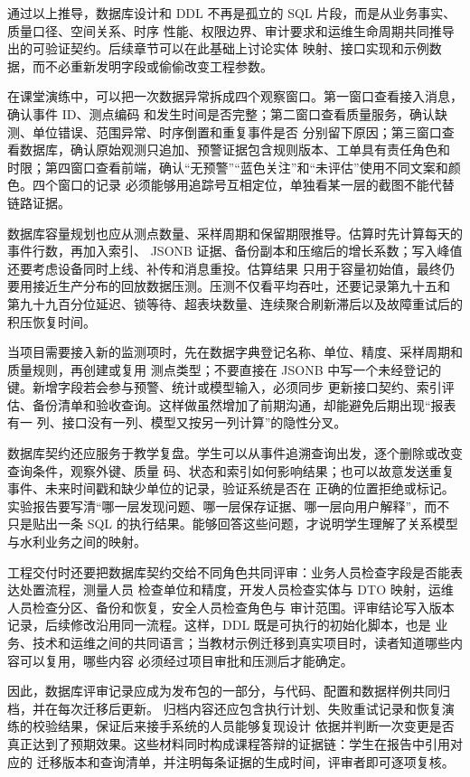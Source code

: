 通过以上推导，数据库设计和 DDL 不再是孤立的 SQL 片段，而是从业务事实、质量口径、空间关系、时序
性能、权限边界、审计要求和运维生命周期共同推导出的可验证契约。后续章节可以在此基础上讨论实体
映射、接口实现和示例数据，而不必重新发明字段或偷偷改变工程参数。

在课堂演练中，可以把一次数据异常拆成四个观察窗口。第一窗口查看接入消息，确认事件 ID、测点编码
和发生时间是否完整；第二窗口查看质量服务，确认缺测、单位错误、范围异常、时序倒置和重复事件是否
分别留下原因；第三窗口查看数据库，确认原始观测只追加、预警证据包含规则版本、工单具有责任角色和
时限；第四窗口查看前端，确认“无预警”“蓝色关注”和“未评估”使用不同文案和颜色。四个窗口的记录
必须能够用追踪号互相定位，单独看某一层的截图不能代替链路证据。

数据库容量规划也应从测点数量、采样周期和保留期限推导。估算时先计算每天的事件行数，再加入索引、
JSONB 证据、备份副本和压缩后的增长系数；写入峰值还要考虑设备同时上线、补传和消息重投。估算结果
只用于容量初始值，最终仍要用接近生产分布的回放数据压测。压测不仅看平均吞吐，还要记录第九十五和
第九十九百分位延迟、锁等待、超表块数量、连续聚合刷新滞后以及故障重试后的积压恢复时间。

当项目需要接入新的监测项时，先在数据字典登记名称、单位、精度、采样周期和质量规则，再创建或复用
测点类型；不要直接在 JSONB 中写一个未经登记的键。新增字段若会参与预警、统计或模型输入，必须同步
更新接口契约、索引评估、备份清单和验收查询。这样做虽然增加了前期沟通，却能避免后期出现“报表有一
列、接口没有一列、模型又按另一列计算”的隐性分叉。

数据库契约还应服务于教学复盘。学生可以从事件追溯查询出发，逐个删除或改变查询条件，观察外键、质量
码、状态和索引如何影响结果；也可以故意发送重复事件、未来时间戳和缺少单位的记录，验证系统是否在
正确的位置拒绝或标记。实验报告要写清“哪一层发现问题、哪一层保存证据、哪一层向用户解释”，而不
只是贴出一条 SQL 的执行结果。能够回答这些问题，才说明学生理解了关系模型与水利业务之间的映射。

工程交付时还要把数据库契约交给不同角色共同评审：业务人员检查字段是否能表达处置流程，测量人员
检查单位和精度，开发人员检查实体与 DTO 映射，运维人员检查分区、备份和恢复，安全人员检查角色与
审计范围。评审结论写入版本记录，后续修改沿用同一流程。这样，DDL 既是可执行的初始化脚本，也是
业务、技术和运维之间的共同语言；当教材示例迁移到真实项目时，读者知道哪些内容可以复用，哪些内容
必须经过项目审批和压测后才能确定。

因此，数据库评审记录应成为发布包的一部分，与代码、配置和数据样例共同归档，并在每次迁移后更新。
归档内容还应包含执行计划、失败重试记录和恢复演练的校验结果，保证后来接手系统的人员能够复现设计
依据并判断一次变更是否真正达到了预期效果。这些材料同时构成课程答辩的证据链：学生在报告中引用对应的
迁移版本和查询清单，并注明每条证据的生成时间，评审者即可逐项复核。

